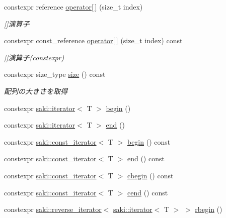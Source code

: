\begin{DoxyCompactItemize}
\item 
constexpr reference \mbox{\hyperlink{classsaki_1_1array_a80d710f65364ea966da0287bea34105d}{operator\mbox{[}$\,$\mbox{]}}} (size\+\_\+t index)
\begin{DoxyCompactList}\small\item\em \mbox{[}\mbox{]}演算子 \end{DoxyCompactList}\item 
constexpr const\+\_\+reference \mbox{\hyperlink{classsaki_1_1array_ae2abbcbe091f9c1634c701bf2257f6a5}{operator\mbox{[}$\,$\mbox{]}}} (size\+\_\+t index) const
\begin{DoxyCompactList}\small\item\em \mbox{[}\mbox{]}演算子(constexpr) \end{DoxyCompactList}\item 
constexpr size\+\_\+type \mbox{\hyperlink{classsaki_1_1array_ae9f4ac2980f19263ef29ac1dca694fed}{size}} () const
\begin{DoxyCompactList}\small\item\em 配列の大きさを取得 \end{DoxyCompactList}\item 
constexpr \mbox{\hyperlink{classsaki_1_1iterator}{saki\+::iterator}}$<$ T $>$ \mbox{\hyperlink{classsaki_1_1array_aa85709bd63dd9f9a5383558b6643a3ba}{begin}} ()
\item 
constexpr \mbox{\hyperlink{classsaki_1_1iterator}{saki\+::iterator}}$<$ T $>$ \mbox{\hyperlink{classsaki_1_1array_ab8fcbb4d2c4fe5dae1b78a7486873402}{end}} ()
\item 
constexpr \mbox{\hyperlink{classsaki_1_1const__iterator}{saki\+::const\+\_\+iterator}}$<$ T $>$ \mbox{\hyperlink{classsaki_1_1array_adeafefc4c1a1cf24a931850366cb85ae}{begin}} () const
\item 
constexpr \mbox{\hyperlink{classsaki_1_1const__iterator}{saki\+::const\+\_\+iterator}}$<$ T $>$ \mbox{\hyperlink{classsaki_1_1array_a6d8e268a8e973e7fed55e0c3b4939e4e}{end}} () const
\item 
constexpr \mbox{\hyperlink{classsaki_1_1const__iterator}{saki\+::const\+\_\+iterator}}$<$ T $>$ \mbox{\hyperlink{classsaki_1_1array_a0423222730174b0538e70c9c7d552e26}{cbegin}} () const
\item 
constexpr \mbox{\hyperlink{classsaki_1_1const__iterator}{saki\+::const\+\_\+iterator}}$<$ T $>$ \mbox{\hyperlink{classsaki_1_1array_a80d8f941a4045ac5b2af32c73548cb57}{cend}} () const
\item 
constexpr \mbox{\hyperlink{classsaki_1_1reverse__iterator}{saki\+::reverse\+\_\+iterator}}$<$ \mbox{\hyperlink{classsaki_1_1iterator}{saki\+::iterator}}$<$ T $>$ $>$ \mbox{\hyperlink{classsaki_1_1array_a965b61c1a08d2b4ef6157dbbe0f6896f}{rbegin}} ()

\end{DoxyCompactItemize}
